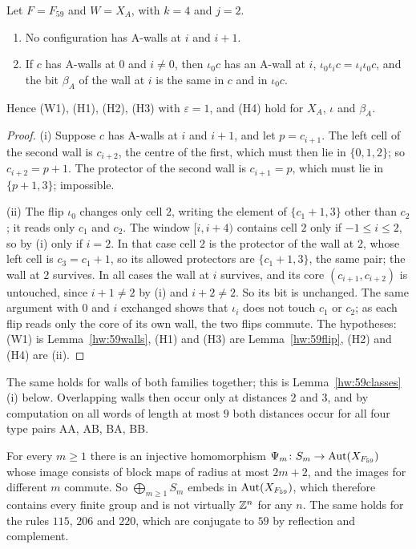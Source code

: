 \begin{lemma}\label{hw:59overlap}
Let $F=F_{59}$ and $W=X_A$, with $k=4$ and $j=2$.
\begin{enumerate}
\item[(i)] No configuration has A-walls at $i$ and $i+1$.
\item[(ii)] If $c$ has A-walls at $0$ and $i\ne0$, then $\iota_0c$ has an A-wall at $i$, $\iota_0\iota_ic=\iota_i\iota_0c$, and the bit $\beta_A$ of the wall at $i$ is the same in $c$ and in $\iota_0c$.
\end{enumerate}
Hence \textup{(W1)}, \textup{(H1)}, \textup{(H2)}, \textup{(H3)} with $\varepsilon=1$, and \textup{(H4)} hold for $X_A$, $\iota$ and $\beta_A$.
\end{lemma}

\begin{proof}
(i) Suppose $c$ has A-walls at $i$ and $i+1$, and let $p=c_{i+1}$. The left cell of the second wall is $c_{i+2}$, the centre of the first, which must then lie in $\{0,1,2\}$; so $c_{i+2}=p+1$. The protector of the second wall is $c_{i+1}=p$, which must lie in $\{p+1,3\}$; impossible.

(ii) The flip $\iota_0$ changes only cell $2$, writing the element of $\{c_1+1,3\}$ other than $c_2$; it reads only $c_1$ and $c_2$. The window $[i,i+4)$ contains cell $2$ only if $-1\le i\le2$, so by (i) only if $i=2$. In that case cell $2$ is the protector of the wall at $2$, whose left cell is $c_3=c_1+1$, so its allowed protectors are $\{c_1+1,3\}$, the same pair; the wall at $2$ survives. In all cases the wall at $i$ survives, and its core $(c_{i+1},c_{i+2})$ is untouched, since $i+1\ne2$ by (i) and $i+2\ne2$. So its bit is unchanged. The same argument with $0$ and $i$ exchanged shows that $\iota_i$ does not touch $c_1$ or $c_2$; as each flip reads only the core of its own wall, the two flips commute. The hypotheses: (W1) is Lemma~\ref{hw:59walls}, (H1) and (H3) are Lemma~\ref{hw:59flip}, (H2) and (H4) are (ii).
\end{proof}

The same holds for walls of both families together; this is Lemma~\ref{hw:59classes}(i) below. Overlapping walls then occur only at distances $2$ and $3$, and by computation on all words of length at most $9$ both distances occur for all four type pairs AA, AB, BA, BB.

\begin{theorem}\label{hw:59}
For every $m\ge1$ there is an injective homomorphism $\Psi_m\colon S_m\to\operatorname{Aut}(X_{F_{59}})$ whose image consists of block maps of radius at most $2m+2$, and the images for different $m$ commute. So $\bigoplus_{m\ge1}S_m$ embeds in $\operatorname{Aut}(X_{F_{59}})$, which therefore contains every finite group and is not virtually $\mathbb{Z}^n$ for any $n$. The same holds for the rules $115$, $206$ and $220$, which are conjugate to $59$ by reflection and complement.
\end{theorem}

